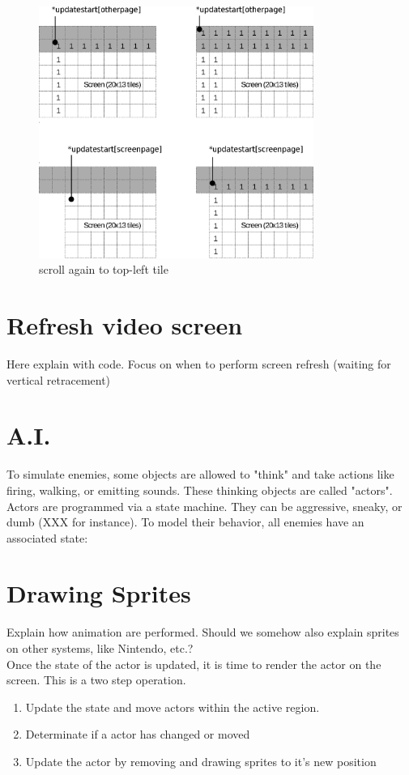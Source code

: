 \documentclass[book.tex]{subfiles}
\begin{document}
\begin{figure}[H]
  \centering
  \includegraphics[width=0.8\textwidth]{imgs/drawings/buffer_tile_move_2.eps}
  \caption{scroll again to top-left tile}
  \label{fig:buffer_tile_move_2}
\end{figure}
\pagebreak





\section{Refresh video screen}
Here explain with code. Focus on when to perform screen refresh (waiting for vertical retracement)

\section{A.I.}
To simulate enemies, some objects are allowed to "think" and take actions like firing, walking,
or emitting sounds. These thinking objects are called "actors".
Actors are programmed via a state machine. They can be aggressive, sneaky, or dumb
(XXX for instance). To model their behavior, all enemies have an associated state:

\section{Drawing Sprites}
Explain how animation are performed. Should we somehow also explain sprites on other systems, like Nintendo, etc.?\\
Once the state of the actor is updated, it is time to render the actor on the screen. This is a two step operation.
\begin{enumerate}
\item Update the state and move actors within the active region.
\item Determinate if a actor has changed or moved
\item Update the actor by removing and drawing sprites to it's new position
\end{enumerate}
\end{document}
